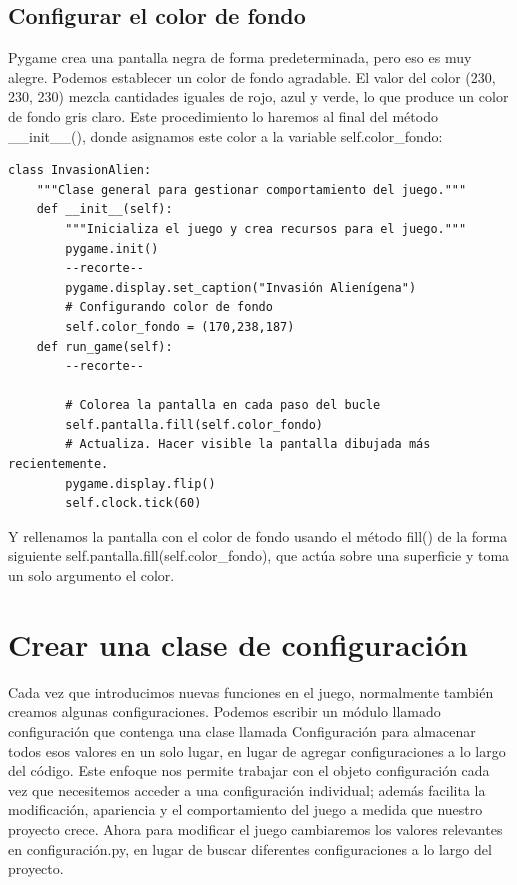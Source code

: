 \subsection{Configurar el color de fondo}

Pygame crea una pantalla negra de forma predeterminada, pero eso es muy alegre. Podemos establecer un color de fondo
agradable. El valor del color (230, 230, 230) mezcla cantidades iguales de rojo, azul y verde, lo que produce un color de fondo gris claro.  Este procedimiento lo haremos  al final del método {\ttfamily \_\_init\_\_()}, donde asignamos este color a la variable  {\ttfamily self.color\_fondo}:
 
\begin{lstlisting}
class InvasionAlien:
    """Clase general para gestionar comportamiento del juego."""
    def __init__(self):
        """Inicializa el juego y crea recursos para el juego."""
        pygame.init()
        --recorte--
        pygame.display.set_caption("Invasión Alienígena")
        # Configurando color de fondo
        self.color_fondo = (170,238,187)
    def run_game(self):
        --recorte--
    
        # Colorea la pantalla en cada paso del bucle
        self.pantalla.fill(self.color_fondo)
        # Actualiza. Hacer visible la pantalla dibujada más recientemente.
        pygame.display.flip()
        self.clock.tick(60)
\end{lstlisting}
 Y rellenamos la pantalla con el color de fondo usando el método {\ttfamily  fill()} de la forma siguiente {\ttfamily self.pantalla.fill(self.color\_fondo)}, que actúa sobre una superficie y toma un solo argumento el color.

\section{Crear una clase de configuración}

Cada vez que introducimos nuevas funciones en el juego, normalmente también creamos algunas configuraciones. Podemos escribir un módulo llamado configuración que contenga una clase llamada Configuración para almacenar todos esos valores en un solo lugar, en lugar
de agregar configuraciones a lo largo del código. Este enfoque nos permite trabajar con el objeto configuración cada vez que necesitemos acceder a una configuración individual; además  facilita la modificación, apariencia y el comportamiento del juego a medida que nuestro proyecto crece. Ahora para modificar el juego cambiaremos los valores relevantes en {\ttfamily configuración.py}, en lugar de buscar diferentes configuraciones a lo largo del proyecto.

